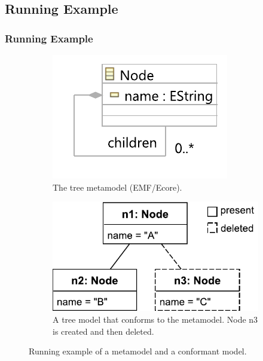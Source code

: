 \documentclass{beamer}
\begin{document}
\begin{frame}
\section{Running Example}
\frametitle{Running Example}
    \begin{figure}[ht]
        \begin{subfigure}[t]{0.45\linewidth}
            \centering
            \includegraphics[width=0.8\linewidth]{node_metamodel}
            \caption{The tree metamodel (EMF/Ecore).}
            \label{fig:tree_metamodel}
        \end{subfigure}
        \hfill
        \begin{subfigure}[t]{0.45\linewidth}
            \centering
            \includegraphics[width=\linewidth]{initial_chart}
            \caption{A tree model that conforms to the  metamodel.  Node n3 is created and then deleted.}
            \label{fig:initial_model}
        \end{subfigure}
        \caption{Running example of a metamodel and a conformant model.}
        \label{fig:append_speed}
    \end{figure}
\end{frame}
\end{document}
